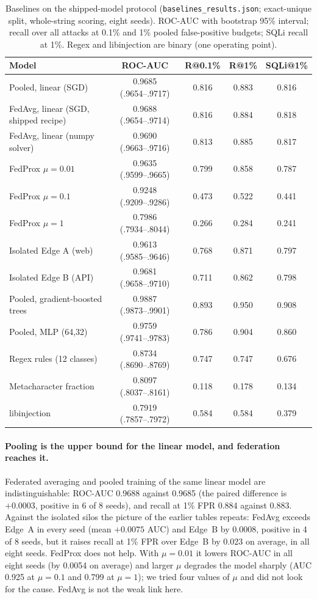 \begin{table}[t]
\centering
\caption{Baselines on the shipped-model protocol (\texttt{baselines\_results.json}; exact-unique split, whole-string scoring, eight seeds). ROC-AUC with bootstrap 95\% interval; recall over all attacks at 0.1\% and 1\% pooled false-positive budgets; SQLi recall at 1\%. Regex and libinjection are binary (one operating point).}
\label{tab:eval-baselines}
\small
\begin{tabular}{@{}lcccc@{}}
\toprule
\textbf{Model} & \textbf{ROC-AUC} & \textbf{R@0.1\%} & \textbf{R@1\%} & \textbf{SQLi@1\%} \\ \midrule
Pooled, linear (SGD) & 0.9685 (.9654--.9717) & 0.816 & 0.883 & 0.816 \\
FedAvg, linear (SGD, shipped recipe) & 0.9688 (.9654--.9714) & 0.816 & 0.884 & 0.818 \\
FedAvg, linear (numpy solver) & 0.9690 (.9663--.9716) & 0.813 & 0.885 & 0.817 \\
FedProx $\mu{=}0.01$ & 0.9635 (.9599--.9665) & 0.799 & 0.858 & 0.787 \\
FedProx $\mu{=}0.1$ & 0.9248 (.9209--.9286) & 0.473 & 0.522 & 0.441 \\
FedProx $\mu{=}1$ & 0.7986 (.7934--.8044) & 0.266 & 0.284 & 0.241 \\
Isolated Edge A (web) & 0.9613 (.9585--.9646) & 0.768 & 0.871 & 0.797 \\
Isolated Edge B (API) & 0.9681 (.9658--.9710) & 0.711 & 0.862 & 0.798 \\ \midrule
Pooled, gradient-boosted trees & 0.9887 (.9873--.9901) & 0.893 & 0.950 & 0.908 \\
Pooled, MLP (64,32) & 0.9759 (.9741--.9783) & 0.786 & 0.904 & 0.860 \\ \midrule
Regex rules (12 classes) & 0.8734 (.8690--.8769) & 0.747 & 0.747 & 0.676 \\
Metacharacter fraction & 0.8097 (.8037--.8161) & 0.118 & 0.178 & 0.134 \\
libinjection & 0.7919 (.7857--.7972) & 0.584 & 0.584 & 0.379 \\ \bottomrule
\end{tabular}
\end{table}

\paragraph{Pooling is the upper bound for the linear model, and federation reaches it.}
Federated averaging and pooled training of the same linear model are indistinguishable: ROC-AUC 0.9688 against 0.9685 (the paired difference is $+0.0003$, positive in 6 of 8 seeds), and recall at 1\% FPR 0.884 against 0.883. Against the isolated silos the picture of the earlier tables repeats: FedAvg exceeds Edge~A in every seed (mean $+0.0075$ AUC) and Edge~B by 0.0008, positive in 4 of 8 seeds, but it raises recall at 1\% FPR over Edge~B by 0.023 on average, in all eight seeds. FedProx does not help. With $\mu=0.01$ it lowers ROC-AUC in all eight seeds (by 0.0054 on average) and larger $\mu$ degrades the model sharply (AUC 0.925 at $\mu=0.1$ and 0.799 at $\mu=1$); we tried four values of $\mu$ and did not look for the cause. FedAvg is not the weak link here.

